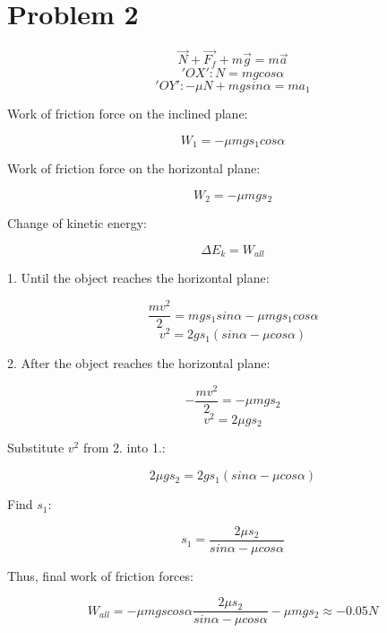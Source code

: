 \section{Problem 2}

\[\vec{N} + \vec{F_f} + m \vec{g} = m \vec{a}\]
\['OX': N = mgcos\alpha\]
\['OY': -\mu N + mgsin\alpha = ma_1\]

Work of friction force on the inclined plane:

\[W_1 = -\mu mgs_1cos\alpha\]

Work of friction force on the horizontal plane:

\[W_2 = -\mu mg s_2\]

Change of kinetic energy:

\[\Delta E_k = W_{all}\]

1. Until the object reaches the horizontal plane:

\[\frac{mv^2}{2} = mgs_1sin\alpha - \mu mgs_1cos\alpha\]
\[v^2 = 2gs_1(sin\alpha - \mu cos\alpha)\]

2. After the object reaches the horizontal plane:

\[-\frac{mv^2}{2} = -\mu mgs_2\]
\[v^2 = 2\mu gs_2\]

Substitute \(v^2\) from 2. into 1.:

\[2\mu gs_2 = 2gs_1(sin\alpha - \mu cos\alpha)\]

Find \(s_1\):

\[s_1 = \frac{2\mu s_2}{sin\alpha - \mu cos\alpha}\]

Thus, final work of friction forces:

\[W_{all} = -\mu mgscos\alpha \frac{2\mu s_2}{sin\alpha - \mu cos\alpha} - \mu mg s_2 \approx \boxed{-0.05 N}\]